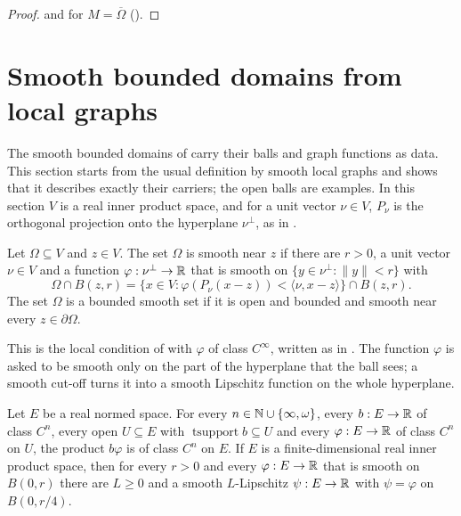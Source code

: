 \begin{proof}
\leanok
{} and  for
$M = \overline{\Omega}$ ().
\end{proof}

\section{Smooth bounded domains from local graphs}
\label{sec:smooth-local-graphs}

The smooth bounded domains of  carry their balls and graph functions as
data. This section starts from the usual definition by smooth local graphs and shows that it
describes exactly their carriers; the open balls are examples. In this section $V$ is a real
inner product space, and for a unit vector $\nu \in V$, $P_\nu$ is the orthogonal projection onto
the hyperplane $\nu^\perp$, as in .

\begin{definition}
\label{def:smooth-near-point}
\leanok
{}
Let $\Omega \subseteq V$ and $z \in V$. The set $\Omega$ is smooth near $z$ if there are $r > 0$,
a unit vector $\nu \in V$ and a function $\varphi : \nu^\perp \to \mathbb{R}$ that is smooth on
$\{y \in \nu^\perp : \|y\| < r\}$ with
\[
  \Omega \cap B(z, r)
  = \{x \in V : \varphi(P_\nu(x - z)) < \langle \nu, x - z \rangle\} \cap B(z, r) .
\]
The set $\Omega$ is a bounded smooth set if it is open and bounded and smooth near every
$z \in \partial\Omega$.
\end{definition}

This is the local condition of \cite[Definition 1.2.1.1]{Grisvard} with $\varphi$ of class
$C^\infty$, written as in . The function $\varphi$ is asked to be
smooth only on the part of the hyperplane that the ball sees; a smooth cut-off turns it into a
smooth Lipschitz function on the whole hyperplane.

\begin{lemma}
\label{lem:smooth-cutoff}
\leanok
Let $E$ be a real normed space. For every $n \in \mathbb{N} \cup \{\infty, \omega\}$, every
$b : E \to \mathbb{R}$ of class $C^n$, every open $U \subseteq E$ with
$\operatorname{tsupport} b \subseteq U$ and every $\varphi : E \to \mathbb{R}$ of class $C^n$ on $U$, the
product $b \varphi$ is of class $C^n$ on $E$. If $E$ is a finite-dimensional real inner product
space, then for every $r > 0$ and every $\varphi : E \to \mathbb{R}$ that is smooth on $B(0, r)$ there are
$L \geq 0$ and a smooth $L$-Lipschitz $\psi : E \to \mathbb{R}$ with $\psi = \varphi$ on $B(0, r/4)$.
\end{lemma}

